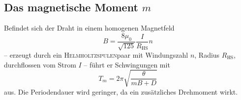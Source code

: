 \subsection{Das magnetische Moment \texorpdfstring{$m$}{m}}

Befindet sich der Draht in einem homogenen Magnetfeld 
\begin{equation}
B=\frac{8\mu_0}{\sqrt{125}} \frac{I}{R_\mathup{HS}}n
\label{eq:B_HS}
\end{equation}
 -- erzeugt durch ein \textsc{Helmholtzspulen}paar mit Windungszahl $n$, Radius $R_\mathup{HS}$, durchflossen vom Strom $I$ -- führt er Schwingungen mit 
\begin{equation}
T_m=2\pi\sqrt{\frac{\theta}{mB+D}}
\label{eq:t_hs}
\end{equation}
aus. Die Periodendauer wird geringer, da ein zusätzliches Drehmoment wirkt.


